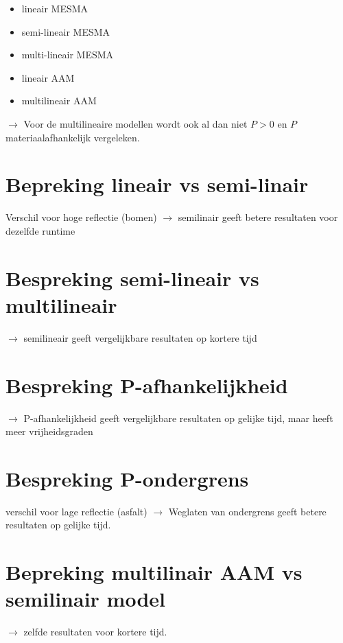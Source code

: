\documentclass[12pt]{report}
\begin{document}
\begin{itemize}
\item lineair MESMA
\item semi-lineair MESMA
\item multi-lineair MESMA
\item lineair AAM
\item multilineair AAM
\end{itemize}

$\rightarrow$ Voor de multilineaire modellen wordt ook al dan niet $P> 0$ en $P$ materiaalafhankelijk vergeleken.



\section{Bepreking lineair vs semi-linair}

Verschil voor hoge reflectie (bomen)
$\rightarrow$ semilinair geeft betere resultaten voor dezelfde runtime

\section{Bespreking semi-lineair vs multilineair}

$\rightarrow$ semilineair geeft vergelijkbare resultaten op kortere tijd

\section{Bespreking P-afhankelijkheid}

$\rightarrow$ P-afhankelijkheid geeft vergelijkbare resultaten op gelijke tijd, maar heeft meer vrijheidsgraden

\section{Bespreking P-ondergrens}

verschil voor lage reflectie (asfalt)
$\rightarrow$ Weglaten van ondergrens geeft betere resultaten op gelijke tijd.

\section{Bepreking multilinair AAM vs semilinair model}

$\rightarrow$ zelfde resultaten voor kortere tijd.

\begin{appendices}


\end{appendices}


\begin{flushleft}
\nocite{*}
{}


\end{flushleft}
\end{document}
